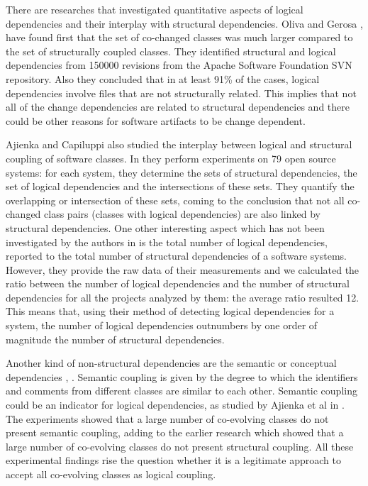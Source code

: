 \documentclass[conference]{IEEEtran}
\begin{document}
There are researches that investigated quantitative aspects of logical dependencies and their interplay with structural dependencies. 
Oliva and Gerosa \cite{Oliva:2011:ISL:2067853.2068086}, \cite{DBLP:conf/issre/OlivaG15} have found first that the set of co-changed classes was much larger compared to the set of structurally coupled classes. They identified structural and logical dependencies from 150000 revisions from the Apache Software Foundation SVN repository. Also they concluded  that in at least 91\% of the cases, logical dependencies involve files that are not structurally related. This implies that not all of the change dependencies are related to structural dependencies and there could be other reasons for software artifacts to be change dependent.

Ajienka and Capiluppi also studied the interplay between logical and structural coupling of software classes. In \cite{DBLP:journals/jss/AjienkaC17} they  perform experiments on 79 open source systems: for each system, they determine the sets of structural dependencies, the set of logical dependencies and the intersections of these sets. They quantify the overlapping or intersection of these sets, coming to the conclusion that not all co-changed class pairs (classes with logical dependencies) are also linked by structural dependencies. One other interesting aspect which has not been investigated by the authors in \cite{DBLP:journals/jss/AjienkaC17}  is the total number of logical dependencies, reported to the total number of structural dependencies of a software systems. However, they provide the raw data of their measurements and we calculated the ratio between the number of logical dependencies and the number of structural dependencies for all the projects analyzed by them: the average ratio resulted 12.  This means that, using their method of detecting logical dependencies for a system, the number of logical dependencies outnumbers by one order of magnitude the number of structural dependencies. 


Another kind of non-structural dependencies are the semantic or conceptual dependencies \cite{Poshyvanyk2009}, \cite{posh2010}. Semantic coupling is given by the degree to which the identifiers
and comments from different classes are similar to each other. Semantic coupling could be an indicator for logical dependencies, as studied by Ajienka et al in \cite{DBLP:journals/ese/AjienkaCC18}. The experiments showed that a large number of co-evolving classes do not present semantic coupling, adding to the earlier research which showed that a large number of co-evolving classes do not present structural coupling. All these experimental findings rise the question whether it is a legitimate approach to accept all co-evolving classes as logical coupling.
\end{document}
